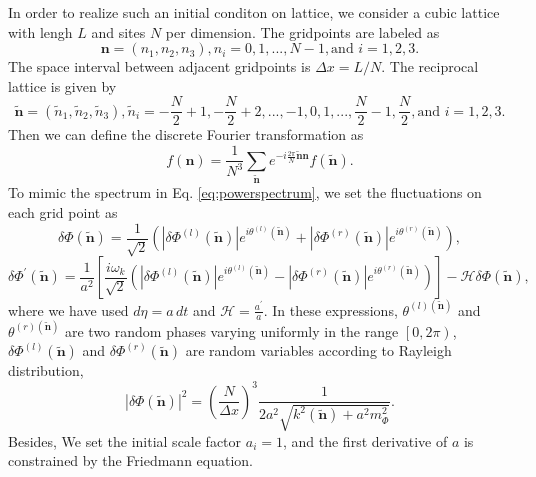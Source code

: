 \documentclass[12pt, a4paper]{article}
\begin{document}
In order to realize such an initial conditon on lattice, we consider a cubic lattice with lengh $L$ and sites $N$ per dimension. The gridpoints are labeled as
\begin{equation}
    \bm{n}=\left(n_1,n_2,n_3\right), n_i=0,1,...,N-1, \text{and } i=1,2,3.
\end{equation}
The space interval between adjacent gridpoints is $\Delta x=L/N$. The reciprocal lattice is given by
\begin{equation}
    \tilde{\bm{n}}=\left(\tilde{n}_1,\tilde{n}_2,\tilde{n}_3\right), \tilde{n}_i=-\frac{N}{2}+1,-\frac{N}{2}+2,...,-1,0,1,...,\frac{N}{2}-1,\frac{N}{2}, \text{and } i=1,2,3.
\end{equation}
Then we can define the discrete Fourier transformation as
\begin{equation}
    f\left(\bm{n}\right)=\frac{1}{N^3}\sum_{\tilde{\bm{n}}}e^{-i\frac{2\pi}{N}\tilde{\bm{n}}\bm{n}}f\left(\tilde{\bm{n}}\right).
\end{equation}
To mimic the spectrum in Eq. \ref{eq:powerspectrum}, we set the fluctuations on each grid point as
\begin{equation}
    \delta\Phi\left(\tilde{\bm{n}}\right)=\frac{1}{\sqrt{2}}\left(\left|\delta\Phi^{\left(l\right)}\left(\tilde{\bm{n}}\right)\right|e^{i\theta^{\left(l\right)}\left(\tilde{\bm{n}}\right)}+\left|\delta\Phi^{\left(r\right)}\left(\tilde{\bm{n}}\right)\right|e^{i\theta^{\left(r\right)}\left(\tilde{\bm{n}}\right)}\right),
\end{equation}
\begin{equation}
    \delta\Phi^{\prime}\left(\tilde{\bm{n}}\right)=\frac{1}{a^2}\left[\frac{i\omega_k}{\sqrt{2}}\left(\left|\delta\Phi^{\left(l\right)}\left(\tilde{\bm{n}}\right)\right|e^{i\theta^{\left(l\right)}\left(\tilde{\bm{n}}\right)}-\left|\delta\Phi^{\left(r\right)}\left(\tilde{\bm{n}}\right)\right|e^{i\theta^{\left(r\right)}\left(\tilde{\bm{n}}\right)}\right)\right]-\mathcal{H}\delta\Phi\left(\tilde{\bm{n}}\right),
\end{equation}
where we have used $d\eta=a\,dt$ and $\mathcal{H}=\frac{a^{\prime}}{a}$. In these expressions, $\theta^{\left(l\right)\left(\tilde{\bm{n}}\right)}$ and $\theta^{\left(r\right)\left(\tilde{\bm{n}}\right)}$ are two random phases varying uniformly in the range $\left[0,2\pi\right)$, $\delta\Phi^{\left(l\right)}\left(\tilde{\bm{n}}\right)$ and $\delta\Phi^{\left(r\right)}\left(\tilde{\bm{n}}\right)$ are random variables according to Rayleigh distribution,
\begin{equation}
    \left|\delta\Phi\left(\tilde{\bm{n}}\right)\right|^2=\left(\frac{N}{\Delta x}\right)^3\frac{1}{2a^2\sqrt{k^2\left(\tilde{\bm{n}}\right)+a^2m_{\Phi}^2}}.
\end{equation}
Besides, We set the initial scale factor $a_i=1$, and the first derivative of $a$ is constrained by the Friedmann equation.
\end{document}
